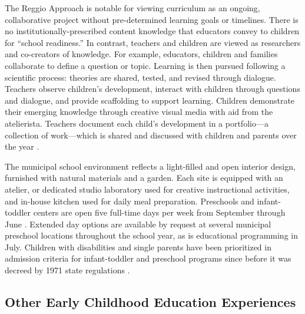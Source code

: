 The Reggio Approach is notable for viewing curriculum as an ongoing, collaborative project without pre-determined learning goals or timelines. There is no institutionally-prescribed content knowledge that educators convey to children for ``school readiness.'' In contrast, teachers and children are viewed as researchers and co-creators of knowledge. For example, educators, children and families collaborate to define a question or topic. Learning is then pursued following a scientific process: theories are shared, tested, and revised through dialogue. Teachers observe children's development, interact with children through questions and dialogue, and provide scaffolding to support learning. Children demonstrate their emerging knowledge through creative visual media with aid from the atelierista. Teachers document each child's development in a portfolio---a collection of work---which is shared and discussed with children and parents over the year \citep{Rinaldi_2006_ReggioEmilia_BOOK,Giudici-Nicolosi_2014_Reggio-Approach}. 

The municipal school environment reflects a light-filled and open interior design, furnished with natural materials and a garden. Each site is equipped with an atelier, or dedicated studio laboratory used for creative instructional activities, and in-house kitchen used for daily meal preparation. Preschools and infant-toddler centers are open five full-time days per week from September through June \citep{Giudici-Nicolosi_2014_Reggio-Approach}. Extended day options are available by request at several municipal preschool locations throughout the school year, as is educational programming in July. Children with disabilities and single parents have been prioritized in admission criteria for infant-toddler and preschool programs since before it was decreed by 1971 state regulations \citep{Edwards-etal-eds_1998_Hundred-Languages}.


\subsection{Other Early Childhood Education Experiences}

